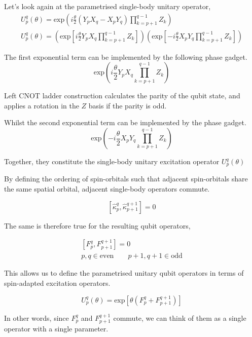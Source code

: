 Let's look again at the parametrised single-body unitary operator,
\begin{equation*}
\begin{gathered}
    U^q_p (\theta) =
    \text{exp} \left( i
    \frac{\theta}{2} (Y_p X_q - X_p Y_q) \prod_{k=p+1}^{q-1} Z_k \right) \\
    U^q_p (\theta) =
    \left( \text{exp} \left[
    i \frac{\theta}{2} Y_p X_q \prod_{k=p+1}^{q-1} Z_k \right] \right)
    \left( \text{exp} \left[ -
    i \frac{\theta}{2} X_p Y_q \prod_{k=p+1}^{q-1} Z_k \right] \right)
\end{gathered}
\end{equation*}

The first exponential term can be implemented by the following phase gadget.
\begin{equation*}
    \text{exp} \left( i
    \frac{\theta}{2} Y_p X_q \prod_{k=p+1}^{q-1} Z_k \right)
\end{equation*}

Left CNOT ladder construction calculates the parity of the qubit state, and applies a rotation in the $Z$ basis if the parity is odd.

Whilst the second exponential term can be implemented by the phase gadget.
\begin{equation*}
    \text{exp} \left( - i
    \frac{\theta}{2} X_p Y_q \prod_{k=p+1}^{q-1} Z_k \right)
\end{equation*}

Together, they constitute the single-body unitary excitation operator $U^q_p (\theta)$

By defining the ordering of spin-orbitals such that adjacent spin-orbitals share the same spatial orbital, adjacent single-body operators commute.

\begin{equation*}
    \left[ \hat\kappa_p^q, \hat\kappa_{p+1}^{q+1} \right] = 0
\end{equation*}\smallskip

The same is therefore true for the resulting qubit operators,

\begin{equation*}
\begin{gathered}
    \left[ F_p^q, F_{p+1}^{q+1} \right] = 0 \\
    p, q \in \text{even} \qquad p+1, q+1 \in \text{odd}
\end{gathered}
\end{equation*}

This allows us to define the parametrised unitary qubit operators in terms of spin-adapted excitation operators.

\begin{equation*}
    U^q_p (\theta) = \text{exp}
    \left[ \theta \left( F_p^q + F_{p+1}^{q+1} \right) \right]
\end{equation*}

In other words, since $F_p^q$ and $F_{p+1}^{q+1}$ commute, we can think of them as a single operator with a single parameter.





